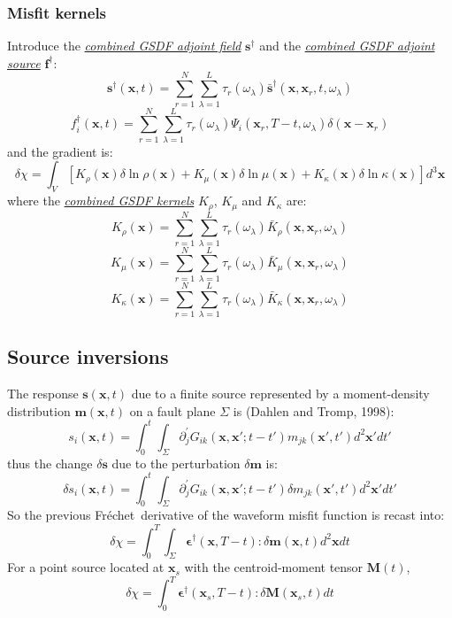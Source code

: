 \documentclass{article}
\newcommand{\mbf}[1]{\mathbf{#1}}
\newcommand{\mynem}[1]{\textsl{\uline{#1}}}
\newcommand{\Frechet}{Fr\'{e}chet~}
\begin{document}
\subsubsection{Misfit kernels}
Introduce the \mynem{combined GSDF adjoint field} $\mbf s^\dagger$ and the \mynem{combined GSDF adjoint source} $\mbf f^\dagger$:
\[ \mbf s^\dagger(\mbf x,t)=\sum_{r=1}^N\sum_{\lambda=1}^L\tau_r(\omega_\lambda)\bar{\mbf s}^\dagger(\mbf x,\mbf x_r,t,\omega_\lambda) \]
\[ f_i^\dagger(\mbf x,t)=\sum_{r=1}^N\sum_{\lambda=1}^L\tau_r(\omega_\lambda)\Psi_i(\mbf x_r,T-t,\omega_\lambda)\delta(\mbf x-\mbf x_r) \]
and the gradient is:
\[ \delta\chi=\int_V[K_\rho(\mbf x)\delta\ln\rho(\mbf x)+K_\mu(\mbf x)\delta\ln\mu(\mbf x)+K_\kappa(\mbf x)\delta\ln\kappa(\mbf x)]d^3\mbf x \]
where the \mynem{combined GSDF kernels} $K_\rho$, $K_\mu$ and $K_\kappa$ are:
\[ K_\rho(\mbf x)=\sum_{r=1}^N\sum_{\lambda=1}^L\tau_r(\omega_\lambda)\bar K_\rho(\mbf x,\mbf x_r,\omega_\lambda) \]
\[ K_\mu(\mbf x)=\sum_{r=1}^N\sum_{\lambda=1}^L\tau_r(\omega_\lambda)\bar K_\mu(\mbf x,\mbf x_r,\omega_\lambda) \]
\[ K_\kappa(\mbf x)=\sum_{r=1}^N\sum_{\lambda=1}^L\tau_r(\omega_\lambda)\bar K_\kappa(\mbf x,\mbf x_r,\omega_\lambda) \]\par
\subsection{Source inversions}
The response $\mbf s(\mbf x,t)$ due to a finite source represented by a moment-density distribution $\mbf m(\mbf x,t)$ on a fault plane $\Sigma$ is (Dahlen and Tromp, 1998):
\[ s_i(\mbf x,t)=\int_0^t\int_\Sigma\partial_j^\prime G_{ik}(\mbf x,\mbf x';t-t')m_{jk}(\mbf x',t')d^2\mbf x'dt' \]
thus the change $\delta\mbf s$ due to the perturbation $\delta\mbf m$ is:
\[ \delta s_i(\mbf x,t)=\int_0^t\int_\Sigma\partial_j^\prime G_{ik}(\mbf x,\mbf x';t-t')\delta m_{jk}(\mbf x',t')d^2\mbf x'dt' \]
So the previous \Frechet derivative of the waveform misfit function is recast into:
\[ \delta\chi=\int_0^T\int_\Sigma\mbf\epsilon^\dagger(\mbf x,T-t):\delta\mbf m(\mbf x,t)d^2\mbf xdt \]
For a point source located at $\mbf x_s$ with the centroid-moment tensor $\mbf M(t)$,
\[ \delta\chi=\int_0^T\mbf\epsilon^\dagger(\mbf x_s,T-t):\delta\mbf M(\mbf x_s,t)dt \]\par
\end{document}
